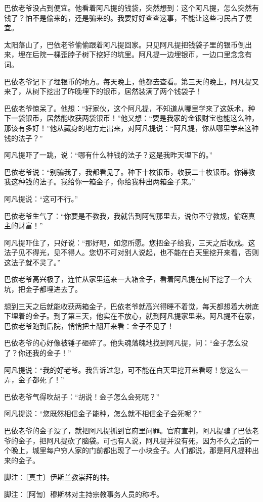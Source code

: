 巴依老爷没占到便宜。他看着阿凡提的钱袋，突然想到：这个阿凡提，怎么突然有钱了？怕不是偷来的，还是骗来的。我要好好查查这事，不能让这些刁民占了便宜。

太阳落山了，巴依老爷偷偷跟着阿凡提回家。只见阿凡提把钱袋子里的银币倒出来，埋在后院一棵歪脖子树下挖好的坑里。阿凡提一边埋银币，一边口里念念有词。

巴依老爷记下了埋银币的地方。每天晚上，他都去查看。第三天的晚上，阿凡提又来了，从树下挖出了昨晚埋下的银币，居然装满了两个钱袋子！

巴依老爷惊呆了。他想：“好家伙，这个阿凡提，不知道从哪里学来了这妖术，种下一袋银币，居然能收获两袋银币！”他又想：“要是我家的金银财宝也能这么种，那该有多好！”他从藏身的地方走出来，对阿凡提说：“阿凡提，你从哪里学来这种钱的法子？”

阿凡提吓了一跳，说：“哪有什么种钱的法子？这是我昨天埋下的。”

巴依老爷说：“别骗我了，我都看见了。种下十枚银币，收获二十枚银币。你得教我这种钱的法子。我给你一箱金子，你给我种出两箱金子来。”

阿凡提说：“这可不行。”

巴依老爷生气了：“你要是不教我，我就告到阿訇那里去，说你不守教规，偷窃真主的财富！”

阿凡提吓住了，只好说：“那好吧，如您所愿。您把金子给我，三天之后收成。这法子见不得光，见不得人。您切不可对别人说起，也不能在白天里挖开来看，否则这法子就不灵了。”

巴依老爷高兴极了，连忙从家里运来一大箱金子，看着阿凡提在树下挖了一个大坑，把金子都埋进去了。

想到三天之后就能收获两箱金子，巴依老爷就高兴得睡不着觉，每天都想着大树底下埋着的金子。到了第三天，他实在不放心，就到阿凡提家里来。阿凡提不在家，巴依老爷跑到后院，悄悄把土翻开来看：金子不见了！

巴依老爷的心好像被锤子砸碎了。他失魂落魄地找到阿凡提，问：“金子怎么没了？你还我的金子！”

阿凡提说：“我的好老爷。我告诉过您，可不能在白天里挖开来看呀！您这么一弄，金子都死了！”

巴依老爷气得吹胡子：“胡说！金子怎么会死呢？”

阿凡提说：“您既然相信金子能种，怎么就不相信金子会死呢？”

巴依老爷的金子没了，就把阿凡提抓到官府里问罪。官府宣判，阿凡提骗了巴依老爷的金子，把阿凡提砍了脑袋。可也有人说，阿凡提并没有死，因为不久之后的一个晚上，城里每户穷人家的门前都出现了一小块金子。人们都说，那是阿凡提种出来的金子。

脚注：〔真主〕伊斯兰教崇拜的神。

脚注：〔阿訇〕穆斯林对主持宗教事务人员的称呼。

